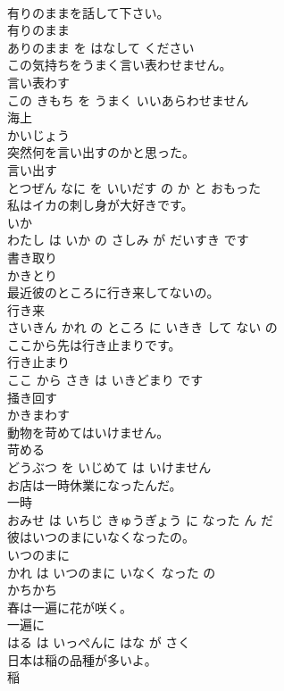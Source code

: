 \documentclass[8pt]{extreport}
\begin{document}
\begin{CJK}{UTF8}{min}
\\	有りのままを話して下さい。	
\\	有りのまま 
\\	ありのまま を はなして ください			
\\	この気持ちをうまく言い表わせません。	
\\	言い表わす 
\\	この きもち を うまく いいあらわせません			
\\	海上	
\\	かいじょう		
\\	突然何を言い出すのかと思った。	
\\	言い出す 
\\	とつぜん なに を いいだす の か と おもった			
\\	私はイカの刺し身が大好きです。	
\\	いか 
\\	わたし は いか の さしみ が だいすき です			
\\	書き取り	
\\	かきとり		
\\	最近彼のところに行き来してないの。	
\\	行き来 
\\	さいきん かれ の ところ に いきき して ない の			
\\	ここから先は行き止まりです。	
\\	行き止まり 
\\	ここ から さき は いきどまり です			
\\	掻き回す	
\\	かきまわす		
\\	動物を苛めてはいけません。	
\\	苛める 
\\	どうぶつ を いじめて は いけません			
\\	お店は一時休業になったんだ。	
\\	一時 
\\	おみせ は いちじ きゅうぎょう に なった ん だ			
\\	彼はいつのまにいなくなったの。	
\\	いつのまに 
\\	かれ は いつのまに いなく なった の			
\\	かちかち	
\\	春は一遍に花が咲く。	
\\	一遍に 
\\	はる は いっぺんに はな が さく			
\\	日本は稲の品種が多いよ。	
\\	稲 

\end{CJK}
\end{document}
